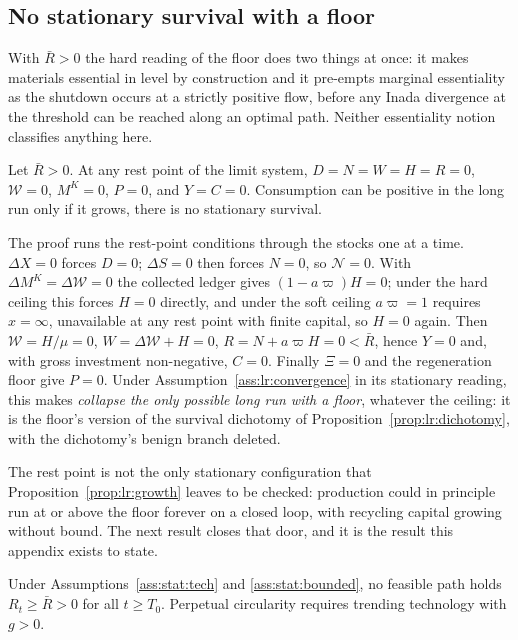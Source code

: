 \subsection{No stationary survival with a floor}\label{sec:app:stat:floor}

With $\bar R>0$ the hard reading of the floor does two things at once: it makes materials essential in level by construction and it pre-empts marginal essentiality as the shutdown occurs at a strictly positive flow, before any Inada divergence at the threshold can be reached along an optimal path. Neither essentiality notion classifies anything here.

\begin{proposition}\label{prop:lr:norest}
Let $\bar R>0$. At any rest point of the limit system, $D=N=W=H=R=0$, $\mathcal W=0$, $M^K=0$, $P=0$, and $Y=C=0$. Consumption can be positive in the long run only if it grows, there is no stationary survival.
\end{proposition}

The proof runs the rest-point conditions through the stocks one at a time. $\Delta X=0$ forces $D=0$; $\Delta S=0$ then forces $N=0$, so $\mathcal N=0$. With $\Delta M^K=\Delta\mathcal W=0$ the collected ledger gives $\left(1-a\varpi\right)H=0$; under the hard ceiling this forces $H=0$ directly, and under the soft ceiling $a\varpi=1$ requires $x=\infty$, unavailable at any rest point with finite capital, so $H=0$ again. Then $\mathcal W=H/\mu=0$, $W=\Delta\mathcal W+H=0$, $R=N+a\varpi H=0<\bar R$, hence $Y=0$ and, with gross investment non-negative, $C=0$. Finally $\Xi=0$ and the regeneration floor give $P=0$. Under Assumption~\ref{ass:lr:convergence} in its stationary reading, this makes \emph{collapse the only possible long run with a floor}, whatever the ceiling: it is the floor's version of the survival dichotomy of Proposition~\ref{prop:lr:dichotomy}, with the dichotomy's benign branch deleted.

The rest point is not the only stationary configuration that Proposition~\ref{prop:lr:growth} leaves to be checked: production could in principle run at or above the floor forever on a closed loop, with recycling capital growing without bound. The next result closes that door, and it is the result this appendix exists to state.

\begin{proposition}\label{prop:stat:noloop}
Under Assumptions~\ref{ass:stat:tech} and \ref{ass:stat:bounded}, no feasible path holds $R_t\ge\bar R>0$ for all $t\ge T_0$. Perpetual circularity requires trending technology with $g>0$.
\end{proposition}

